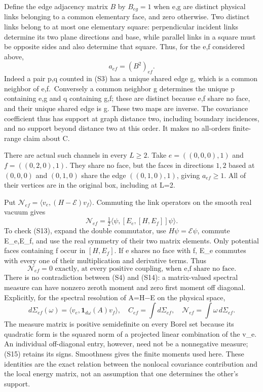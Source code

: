 Define the edge adjacency matrix \(B\) by \(B_{eg}=1\) when e,g are distinct physical links belonging to a common elementary face, and zero otherwise. Two distinct links belong to at most one elementary square: perpendicular incident links determine its two plane directions and base, while parallel links in a square must be opposite sides and also determine that square. Thus, for the e,f considered above, \[
 \boxed{a_{ef}=(B^2)_{ef}.}
\tag{S12}
\] Indeed a pair p,q counted in (S3) has a unique shared edge g, which is a common neighbor of e,f.~Conversely a common neighbor g determines the unique p containing e,g and q containing g,f; these are distinct because e,f share no face, and their unique shared edge is g. These two maps are inverse. The covariance coefficient thus has support at graph distance two, including boundary incidences, and no support beyond distance two at this order. It makes no all-orders finite-range claim about C.

There are actual such channels in every \(L\ge2\). Take \(e=((0,0,0),1)\) and \(f=((0,2,0),1)\). They share no face, but the faces in directions \(1,2\) based at \((0,0,0)\) and \((0,1,0)\) share the edge \(((0,1,0),1)\), giving \(a_{ef}\geq1\). All of their vertices are in the original box, including at L=2.

Put \(\mathcal N_{ef}=\langle v_e,(H-\mathcal E)v_f\rangle\). Commuting the link operators on the smooth real vacuum gives \[
 \mathcal N_{ef}=\tfrac12
 \langle\psi,[E_e,[H,E_f]]\psi\rangle.
\tag{S13}
\] To check (S13), expand the double commutator, use \(H\psi=\mathcal E\psi\), commute E\_e,E\_f, and use the real symmetry of their two matrix elements. Only potential faces containing f occur in \([H,E_f]\). If e shares no face with f, E\_e commutes with every one of their multiplication and derivative terms. Thus \[
 \boxed{\mathcal N_{ef}=0\text{ exactly, at every positive coupling,
 when e,f share no face}.}
\tag{S14}
\] There is no contradiction between (S4) and (S14): a matrix-valued spectral measure can have nonzero zeroth moment and zero first moment off diagonal. Explicitly, for the spectral resolution of A=H\(-\)E on the physical space, \[
 d\Sigma_{ef}(\omega)=\langle v_e,\mathbf1_{d\omega}(A)v_f\rangle,
 \quad C_{ef}=\int d\Sigma_{ef},\quad
 \mathcal N_{ef}=\int\omega\,d\Sigma_{ef}.
\tag{S15}
\] The measure matrix is positive semidefinite on every Borel set because its quadratic form is the squared norm of a projected linear combination of the v\_e. An individual off-diagonal entry, however, need not be a nonnegative measure; (S15) retains its signs. Smoothness gives the finite moments used here. These identities are the exact relation between the nonlocal covariance contribution and the local energy matrix, not an assumption that one determines the other's support.

